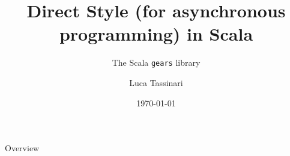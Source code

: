 \documentclass[aspectratio=1610,xcolor=dvipsnames]{beamer}
\title{Direct Style (for asynchronous programming) in Scala}
\subtitle{The Scala \texttt{gears} library}
\author{Luca Tassinari}
\date{\today} %
\begin{document}
\begin{frame}
  \titlepage
\end{frame}

\begin{frame}{Overview}
  \tableofcontents
\end{frame}

\end{document}

